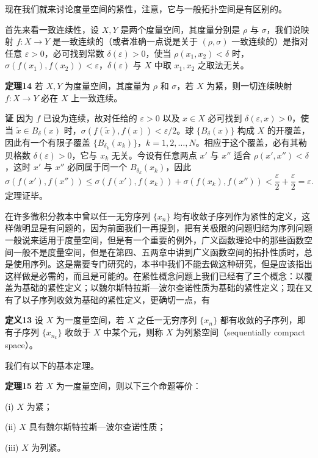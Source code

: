 现在我们就来讨论度量空间的紧性，注意，它与一般拓扑空间是有区别的。

首先来看一致连续性，设 $X,Y$ 是两个度量空间，其度量分别是 $\rho$ 与 $\sigma$，我们说映射 $f:X\to Y$ 是一致连续的（或者准确一点说是关于 $(\rho,\sigma)$ 一致连续的）是指对任意 $\varepsilon>0$，必可找到常数 $\delta(\varepsilon)>0$，使当 $\rho(x_1,x_2)<\delta$ 时，$\sigma(f(x_1),f(x_2))<\varepsilon$，$\delta(\varepsilon)$ 与 $X$ 中取 $x_1,x_2$ 之取法无关。

\noindent\textbf{定理14}\quad
若 $X,Y$ 为度量空间，其度量为 $\rho$ 和 $\sigma$，若 $X$ 为紧，则一切连续映射 $f:X\to Y$ 必在 $X$ 上一致连续。

\noindent\textbf{证}\quad
因为 $f$ 已设为连续，故对任给的 $\varepsilon>0$ 以及 $x\in X$ 必可找到 $\delta(\varepsilon,x)>0$，使当 $\tilde x\in B_\delta(x)$ 时，$\sigma(f(\tilde x),f(x))<\varepsilon/2$。球 $\{B_\delta(x)\}$ 构成 $X$ 的开覆盖，因此有一个有限子覆盖 $\{B_{\delta_k}(x_k)\}$，$k=1,2,\ldots,N$。相应于这个覆盖，必有其勒贝格数 $\delta(\varepsilon)>0$，它与 $x_k$ 无关。今设有任意两点 $x'$ 与 $x''$ 适合 $\rho(x',x'')<\delta$，这时 $x'$ 与 $x''$ 必同属于同一个 $B_{\delta_k}(x_k)$，因此
\[
 \sigma(f(x'),f(x''))\le \sigma(f(x'),f(x_k))+\sigma(f(x_k),f(x''))
 <\frac{\varepsilon}{2}+\frac{\varepsilon}{2}=\varepsilon.
\]
定理证毕。

在许多微积分教本中曾以任一无穷序列 $\{x_n\}$ 均有收敛子序列作为紧性的定义，这样做明显是有问题的，因为前面我们一再提到，把有关极限的问题归结为序列问题一般说来适用于度量空间，但是有一个重要的例外，广义函数理论中的那些函数空间一般不是度量空间，但是在第四、五两章中讲到广义函数空间的拓扑性质时，总是使用序列。这是需要专门研究的，本书中我们不能去做这种研究，但是应该指出这样做是必需的，而且是可能的。在紧性概念问题上我们已经有了三个概念：以覆盖为基础的紧性定义；以魏尔斯特拉斯—波尔查诺性质为基础的紧性定义；现在又有了以子序列收敛为基础的紧性定义，更确切一点，有

\noindent\textbf{定义13}\quad
设 $X$ 为一度量空间，若 $X$ 之任一无穷序列 $\{x_n\}$ 都有收敛的子序列，即有子序列 $\{x_{n_k}\}$ 收敛于 $X$ 中某个元，则称 $X$ 为列紧空间（sequentially compact space）。

我们有以下的基本定理。

\noindent\textbf{定理15}\quad
若 $X$ 为一度量空间，则以下三个命题等价：

\noindent(i) $X$ 为紧；

\noindent(ii) $X$ 具有魏尔斯特拉斯—波尔查诺性质；

\noindent(iii) $X$ 为列紧。

